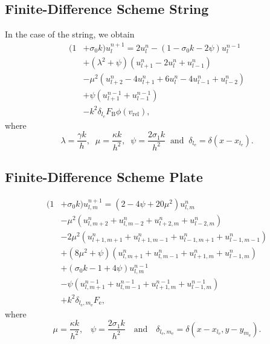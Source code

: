 \documentclass{article}
\begin{document}
\subsection{Finite-Difference Scheme String}
In the case of the string, we obtain
\begin{equation}
    \begin{aligned}\label{eq:stringImplementation}
        (1 &+ \sigma_0k)u_l^{n+1} = 2u_l^n - (1 - \sigma_0k - 2\psi) u_l^{n-1} \\
        & +(\lambda^2 + \psi)(u_{l+1}^n - 2u_l^n + u_{l-1}^n)\\
        &- \mu^2(u_{l+2}^n - 4u_{l+1}^n + 6u_l^n - 4u_{l-1}^n + u_{l-2}^n) \\
        &+ \psi(u_{l+1}^{n-1} + u_{l-1}^{n-1})\\
        &-k^2\delta_{l_e}F_\text{B}\phi(v_\text{rel}),
    \end{aligned}
\end{equation}
where
\begin{equation}\nonumber
\lambda = \frac{\gamma k}{h}, \;\; \mu =  \frac{\kappa k}{h^2}, \;\; \psi = \frac{2\sigma_1k}{h^2} \;\; \text{and} \;\; \delta_{l_\text{e}} = \delta(x-x_{l_\text{e}}). 
\end{equation}
\subsection{Finite-Difference Scheme Plate}
\begin{equation}
    \begin{aligned}\label{eq:plateImplementation}
        (1& + \sigma_0k)u_{l,m}^{n+1} = (2 - 4\psi + 20\mu^2)u_{l,m}^n\\
    &-\mu^2 (u_{l,m + 2}^n + u_{l,m - 2}^n + u_{l + 2,m}^n + u_{l - 2,m}^n)\\
    &- 2\mu^2(u_{l + 1,m + 1}^n + u_{l + 1,m - 1}^n + u_{l - 1,m + 1}^n + u_{l - 1,m - 1}^n)\\
    &+ (8\mu^2 + \psi)(u_{l,m + 1}^n + u_{l,m - 1}^n + u_{l + 1,m}^n + u_{l - 1,m}^n)\\
    &+ (\sigma_0 k - 1 + 4\psi) u_{l,m}^{n-1}\\
    &- \psi(u_{l,m + 1}^{n-1} + u_{l,m - 1}^{n-1} + u_{l + 1,m}^{n-1} + u_{l - 1,m}^{n-1})\\
    &+ k^2 \delta_{l_\text{e}, m_\text{e}}F_\text{e},
\end{aligned}
\end{equation}
where
\begin{equation}\nonumber
    \mu = \frac{\kappa k}{h^2} \text{,} \quad \psi = \frac{2\sigma_1k}{h^2} \quad \text{and} \quad \delta_{l_\text{e}, m_\text{e}} = \delta(x - x_{l_\text{e}}, y - y_{m_\text{e}}).
\end{equation}
\end{document}
